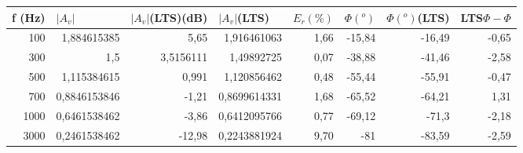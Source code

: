 \documentclass{article}
\begin{document}
\begin{table}[h!]
\centering
\begin{tabular}{|r|r|r|r|r|r|r|r|}
\hline
\multicolumn{1}{|l|}{f (Hz)} & \multicolumn{1}{l|}{$|A_v|$} & \multicolumn{1}{l|}{$|A_v|$(LTS)(dB)} & \multicolumn{1}{l|}{$|A_v|$(LTS)} & \multicolumn{1}{l|}{$E_r(\%)$} & \multicolumn{1}{l|}{$\Phi (^o)$} & \multicolumn{1}{l|}{$\Phi (^o)$(LTS)} & \multicolumn{1}{l|}{LTS$\Phi-\Phi$} \\ \hline
100                                  & 1,884615385                  & 5,65                                                           & 1,916461063                                                & 1,66                    & -15,84                           & -16,49                                    & -0,65                 \\ \hline
300                                  & 1,5                          & 3,5156111                                                      & 1,49892725                                                 & 0,07                  & -38,88                           & -41,46                                    & -2,58                 \\ \hline
500                                  & 1,115384615                  & 0,991                                                          & 1,120856462                                                & 0,48                   & -55,44                           & -55,91                                    & -0,47                 \\ \hline
700                                  & 0,8846153846                 & -1,21                                                          & 0,8699614331                                               & 1,68                   & -65,52                           & -64,21                                    & 1,31                  \\ \hline
1000                                 & 0,6461538462                 & -3,86                                                          & 0,6412095766                                               & 0,77                    & -69,12                           & -71,3                                     & -2,18                 \\ \hline
3000                                 & 0,2461538462                 & -12,98                                                         & 0,2243881924                                               & 9,70                    & -81                              & -83,59                                    & -2,59                 \\ \hline

\end{tabular}
\end{table}
\end{document}
